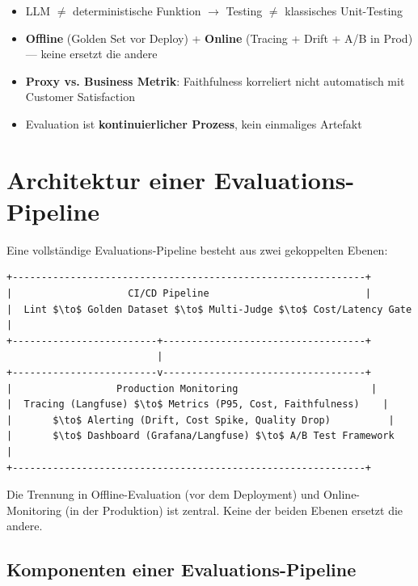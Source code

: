 \par
\vspace{0.5cm}
\begin{merkeEnv}
\begin{itemize}
    \item LLM $\neq$ deterministische Funktion $\to$ Testing $\neq$ klassisches Unit-Testing
    \item \textbf{Offline} (Golden Set vor Deploy) + \textbf{Online} (Tracing + Drift + A/B in Prod) — keine ersetzt die andere
    \item \textbf{Proxy vs. Business Metrik}: Faithfulness korreliert nicht automatisch mit Customer Satisfaction
    \item Evaluation ist \textbf{kontinuierlicher Prozess}, kein einmaliges Artefakt
\end{itemize}
\end{merkeEnv}

\section{Architektur einer Evaluations-Pipeline}

Eine vollständige Evaluations-Pipeline besteht aus zwei gekoppelten Ebenen:

\begin{verbatim}
+-------------------------------------------------------------+
|                    CI/CD Pipeline                           |
|  Lint $\to$ Golden Dataset $\to$ Multi-Judge $\to$ Cost/Latency Gate   |
+-------------------------+-----------------------------------+
                          |
+-------------------------v-----------------------------------+
|                  Production Monitoring                       |
|  Tracing (Langfuse) $\to$ Metrics (P95, Cost, Faithfulness)    |
|       $\to$ Alerting (Drift, Cost Spike, Quality Drop)          |
|       $\to$ Dashboard (Grafana/Langfuse) $\to$ A/B Test Framework   |
+-------------------------------------------------------------+
\end{verbatim}

Die Trennung in Offline-Evaluation (vor dem Deployment) und Online-Monitoring (in der Produktion) ist zentral. Keine der beiden Ebenen ersetzt die andere.

\subsection{Komponenten einer Evaluations-Pipeline}

